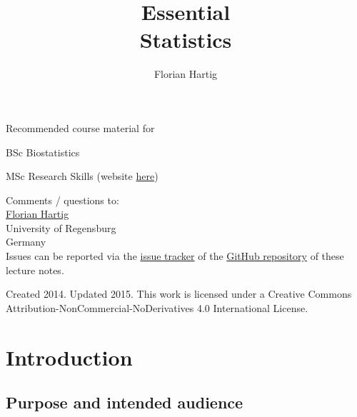 \documentclass[a4paper,twoside]{tufte-book}\usepackage[]{graphicx}\usepackage[]{color}
\title{Essential\\Statistics}
\author{Florian Hartig}
\begin{document}

\let\cleardoublepage\clearpage %
\maketitle


\thispagestyle{empty}
\null

\begin{fullwidth}
Recommended course material for

\begin{itemize*}
  \item BSc Biostatistics
  \item MSc Research Skills (website \href{http://florianhartig.github.io/ResearchSkills/}{here})
\end{itemize*}

\vspace{0.5cm}

Comments / questions to:\\[0.5cm]
\href{https://florianhartig.wordpress.com/}{Florian Hartig}\\
University of Regensburg\\
Germany\\[0.5cm]

Issues can be reported via the \href{https://github.com/florianhartig/Statistics/issues}{issue tracker} of the \href{https://github.com/florianhartig/Statistics/tree/master/EssentialStatistics}{GitHub repository} of these lecture notes. 

\end{fullwidth}


\vfill
\begin{fullwidth}
Created 2014. Updated 2015. This work is licensed under a Creative Commons Attribution-NonCommercial-NoDerivatives 4.0 International License.
\end{fullwidth}


\newpage
\tableofcontents

\chapter{Introduction} %

\section{Purpose and intended audience}
\end{document}
